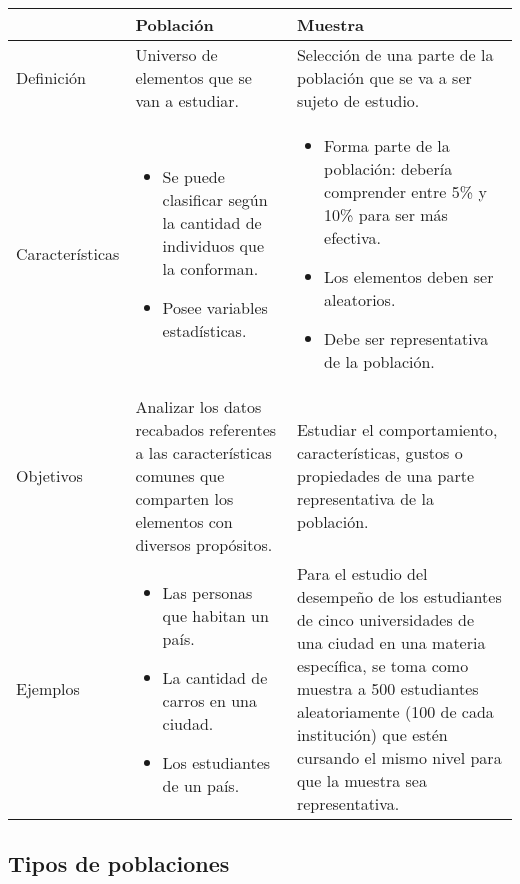 \begin{tabular}{l|p{6cm}|p{6cm}}
                & \textbf{Población}    &   \textbf{Muestra}    \\
\hline

Definición  & 	Universo de elementos que se van a estudiar.    &   Selección de
una parte de la población que se va a ser sujeto de estudio.   \\

\hline

Características &   

\begin{itemize} 
    \item Se puede clasificar según la cantidad de individuos que la conforman. 
    \item Posee variables estadísticas. 
\end{itemize}
& \begin{itemize}
    \item Forma parte de la población: debería comprender entre 5\% y 10\% para ser más
efectiva. 
    \item Los elementos deben ser aleatorios. 
    \item Debe ser representativa de la población.
\end{itemize} \\
\hline

    Objetivos & Analizar los datos recabados referentes a las características comunes que
comparten los elementos con diversos propósitos. & Estudiar el comportamiento,
características, gustos o propiedades de una parte representativa de la
población. \\

\hline

Ejemplos & \begin{itemize} \item Las personas que habitan un país.
\item La cantidad de carros en una ciudad.
\item Los estudiantes de un país.
\end{itemize} & Para el estudio del desempeño de los estudiantes de cinco
universidades de una ciudad en una materia específica, se toma como muestra a
500 estudiantes aleatoriamente (100 de cada institución) que estén cursando el
mismo nivel para que la muestra sea representativa.

\end{tabular}


\subsection{Tipos de poblaciones}

